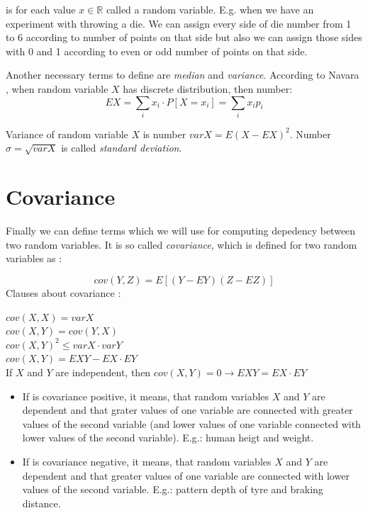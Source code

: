 \documentclass[11pt,twoside,a4paper]{book}
\begin{document}
is for each value $x \in \mathbb{R}$ called a random variable. E.g. when we
have an experiment with throwing a die. We can assign every side of die number
from 1 to 6 according to number of points on that side but also we can assign
those sides with 0 and 1 according to even or odd number of points on that side.

Another necessary terms to define are \textit{median} and \textit{variance}.
According to Navara \cite{navara:mvt}, when random variable $X$ has discrete distribution, then
number:
$$EX=\sum_i x_i\cdot P\left[X=x_i\right]=\sum_i x_i p_i$$

Variance of random variable $X$ is number $var X = E(X-EX)^2$. Number $\sigma =
\sqrt{var X}$ is called \textit{standard deviation}.

\section{Covariance}
Finally we can define terms which we will use for computing depedency between
two random variables. It is so called \textit{covariance}, which is defined for two
random variables as \cite{navara:mvt}:

$$cov(Y,Z)=E\left[\left(Y-EY\right)\left(Z-EZ\right)\right]$$
Clauses about covariance \cite{kulich:stat}:

\begin{center}
$cov(X,X)=var X$\\
$cov(X,Y)=cov(Y,X)$\\
$cov(X,Y)^2\leq var X \cdot var Y$\\
$cov(X,Y) = EXY - EX\cdot EY$\\
If $X$ and $Y$ are independent, then
$cov\left(X,Y\right)=0 \rightarrow EXY=EX\cdot EY$\\
\end{center}
\begin{itemize}
  \item If is covariance positive, it means, that random variables $X$ and
$Y$ are dependent and that grater values of one variable are connected with
greater values of the second variable (and lower values of one variable connected with
lower values of the second variable). E.g.: human heigt and weight.
  \item If is covariance negative, it means, that random variables $X$ and
$Y$ are dependent and that greater values of one variable are connected with
lower values of the second variable. E.g.: pattern depth
of tyre and braking distance.
\end{itemize}
\end{document}
